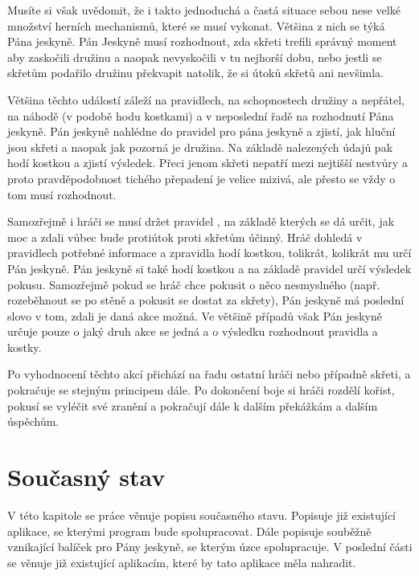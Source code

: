 \documentclass[thesis=B,czech]{resources/FITthesis}[2012/06/26]
\begin{document}
Musíte si však uvědomit, že i takto jednoduchá a častá situace sebou nese velké množství herních mechanismů, které se musí vykonat. Většina z nich se týká Pána jeskyně. Pán Jeskyně musí rozhodnout, zda skřeti trefili správný moment aby zaskočili družinu a naopak nevyskočili v tu nejhorší dobu, nebo jestli se skřetům podařilo družinu překvapit natolik, že si útoků skřetů ani nevšimla. \par

Většina těchto událostí záleží na pravidlech, na schopnostech družiny a nepřátel, na náhodě (v podobě hodu kostkami) a v neposlední řadě na rozhodnutí Pána jeskyně. Pán jeskyně nahlédne do pravidel pro pána jeskyně\cite{draci_doupe_PJ} a zjistí, jak hluční jsou skřeti a naopak jak pozorná je družina. Na základě nalezených údajů pak hodí kostkou a zjistí výsledek. Přeci jenom skřeti nepatří mezi nejtišší nestvůry a proto pravděpodobnost tichého přepadení je velice mizivá, ale přesto se vždy o tom musí rozhodnout. \par

Samozřejmě i hráči se musí držet pravidel \cite{draci_doupe}, na základě kterých se dá určit, jak moc a zdali vůbec bude protiútok proti skřetům účinný. Hráč dohledá v pravidlech potřebné informace a zpravidla hodí kostkou, tolikrát, kolikrát mu určí Pán jeskyně. Pán jeskyně si také hodí kostkou a na základě pravidel určí výsledek pokusu. Samozřejmě pokud se hráč chce pokusit o něco nesmyslného (např. rozeběhnout se po stěně a pokusit se dostat za skřety), Pán jeskyně má poslední slovo v tom, zdali je daná akce možná. Ve většině případů však Pán jeskyně určuje pouze o jaký druh akce se jedná a o výsledku rozhodnout pravidla a kostky. \par

Po vyhodnocení těchto akcí přichází na řadu ostatní hráči nebo případně skřeti, a pokračuje se stejným principem dále. Po dokončení boje si hráči rozdělí kořist, pokusí se vyléčit své zranění a pokračují dále k dalším překážkám a dalším úspěchům.


\chapter{Současný stav}
V této kapitole se práce věnuje popisu současného stavu. Popisuje již existující aplikace, se kterými program bude spolupracovat. Dále popisuje souběžně vznikající balíček pro Pány jeskyně, se kterým úzce spolupracuje. V poslední části se věnuje již existující aplikacím, které by tato aplikace měla nahradit.
\end{document}
